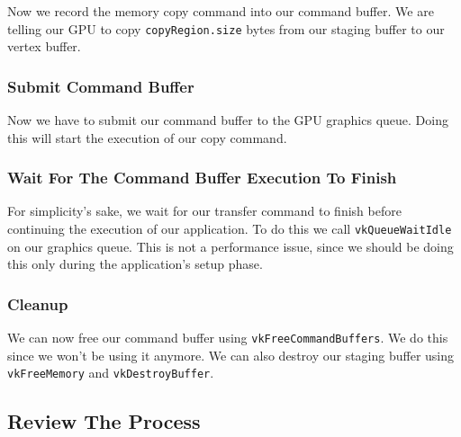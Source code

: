 Now we record the memory copy command into our command buffer.
We are telling our GPU to copy \texttt{copyRegion.size} bytes
from our staging buffer to our vertex buffer.

\begin{minipage}{\linewidth}{\noindent}
    
\end{minipage}

\subsubsection{Submit Command Buffer}

Now we have to submit our command buffer to the GPU graphics queue.
Doing this will start the execution of our copy command.

\begin{minipage}{\linewidth}{\noindent}
    
\end{minipage}

\subsubsection{Wait For The Command Buffer Execution To Finish}

For simplicity's sake, we wait for our transfer command to finish
before continuing the execution of our application.
To do this we call \texttt{vkQueueWaitIdle} on our graphics queue.
This is not a performance issue, since we should be doing this
only during the application's setup phase.

\subsubsection{Cleanup}

We can now free our command buffer using \texttt{vkFreeCommandBuffers}.
We do this since we won't be using it anymore.
We can also destroy our staging buffer using \texttt{vkFreeMemory}
and \texttt{vkDestroyBuffer}.

\subsection{Review The Process}

